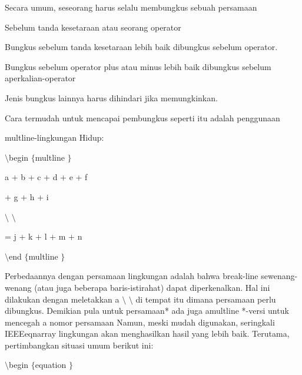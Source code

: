  Secara umum, seseorang harus selalu membungkus sebuah persamaan \par
\noindent 
 Sebelum tanda kesetaraan atau seorang operator \par
\noindent 
 Bungkus sebelum tanda kesetaraan lebih baik dibungkus sebelum operator. \par
Bungkus sebelum operator plus atau minus lebih baik dibungkus sebelum aperkalian-operator \par
\noindent 
 Jenis bungkus lainnya harus dihindari jika memungkinkan.
 \par
\vspace{12pt}
\vspace{12pt}
\noindent 
Cara termudah untuk mencapai pembungkus seperti itu adalah penggunaan \par
\noindent 
multline-lingkungan Hidup: \par
\vspace{12pt}
\noindent 
 $  \setminus  $begin $  \{  $multline $  \}  $ \par
\vspace{12pt}
\noindent 
a + b + c + d + e + f \par
\vspace{12pt}
\noindent 
+ g + h + i \par
\vspace{12pt}
\noindent 
 $  \setminus  $ $  \setminus  $ \par
\vspace{12pt}
\noindent 
= j + k + l + m + n \par
\vspace{12pt}
\noindent 
 $  \setminus  $end $  \{  $multline $  \}  $ \par
\vspace{12pt}
\noindent 
 \hspace*{0.5in} Perbedaannya dengan persamaan lingkungan adalah bahwa break-line sewenang-wenang (atau juga beberapa baris-istirahat) dapat diperkenalkan. Hal ini dilakukan dengan meletakkan a $  \setminus  $ $  \setminus  $ di tempat itu dimana persamaan perlu dibungkus. Demikian pula untuk persamaan* ada juga amultline *-versi untuk mencegah a nomor persamaan Namun, meski mudah digunakan, seringkali IEEEeqnarray lingkungan akan menghasilkan hasil yang lebih baik. Terutama, pertimbangkan situasi umum berikut ini: \par
\vspace{12pt}
\vspace{12pt}
\noindent 
 $  \setminus  $begin $  \{  $equation $  \}  $ \par
